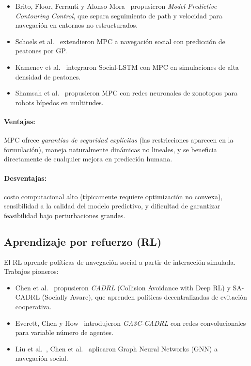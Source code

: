 \documentclass[12pt,a4paper,oneside]{book}
\begin{document}
\begin{itemize}
    \item Brito, Floor, Ferranti y Alonso-Mora~\cite{Brito2019} propusieron \emph{Model Predictive Contouring Control}, que separa seguimiento de path y velocidad para navegación en entornos no estructurados.
    \item Schoels et al.~\cite{Schoels2020} extendieron MPC a navegación social con predicción de peatones por GP.
    \item Kamenev et al.~\cite{Kamenev2023} integraron Social-LSTM con MPC en simulaciones de alta densidad de peatones.
    \item Shamsah et al.~\cite{Shamsah2024} propusieron MPC con redes neuronales de zonotopos para robots bípedos en multitudes.
\end{itemize}

\paragraph{Ventajas:} MPC ofrece \emph{garantías de seguridad explícitas} (las restricciones aparecen en la formulación), maneja naturalmente dinámicas no lineales, y se beneficia directamente de cualquier mejora en predicción humana.

\paragraph{Desventajas:} costo computacional alto (típicamente requiere optimización no convexa), sensibilidad a la calidad del modelo predictivo, y dificultad de garantizar feasibilidad bajo perturbaciones grandes.

\subsection{Aprendizaje por refuerzo (RL)}

El RL aprende políticas de navegación social a partir de interacción simulada. Trabajos pioneros:

\begin{itemize}
    \item Chen et al.~\cite{Chen2017,Chen2019} propusieron \emph{CADRL} (Collision Avoidance with Deep RL) y SA-CADRL (Socially Aware), que aprenden políticas decentralizadas de evitación cooperativa.
    \item Everett, Chen y How~\cite{Everett2018} introdujeron \emph{GA3C-CADRL} con redes convolucionales para variable número de agentes.
    \item Liu et al.~\cite{Liu2023}, Chen et al.~\cite{Chen2023} aplicaron Graph Neural Networks (GNN) a navegación social.
\end{itemize}
\end{document}
